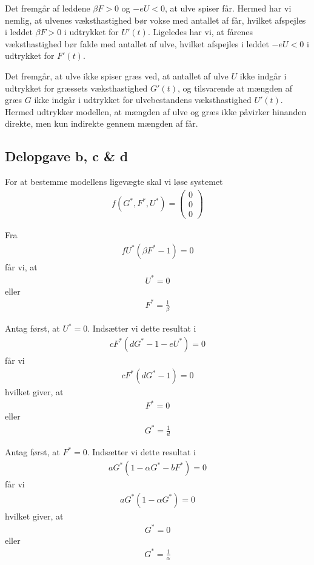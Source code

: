 \documentclass[12pt]{article}
\begin{document}
Det fremgår af leddene $\beta F>0$ og $-eU<0$, at ulve spiser får. Hermed har vi nemlig, at ulvenes væksthastighed bør vokse med antallet af får, hvilket afspejles i leddet $\beta F>0$ i udtrykket for $U'(t)$. Ligeledes har vi, at fårenes væksthastighed bør falde med antallet af ulve, hvilket afspejles i leddet $-eU<0$ i udtrykket for $F'(t)$. 

Det fremgår, at ulve ikke spiser græs ved, at antallet af ulve $U$ ikke indgår i udtrykket for græssets væksthastighed $G'(t)$, og tilsvarende at mængden af græs $G$ ikke indgår i udtrykket for ulvebestandens væksthastighed $U'(t)$. Hermed udtrykker modellen, at mængden af ulve og græs ikke  påvirker hinanden direkte, men kun indirekte gennem mængden af får. 

\subsection{Delopgave b, c \& d}

For at bestemme modellens ligevægte skal vi løse systemet
\begin{align}
f(G^*, F^*, U^*) = \begin{pmatrix}
0 \\ 0 \\ 0
\end{pmatrix}
\end{align}

Fra 
\begin{align}
fU^*(\beta F^* - 1) = 0
\end{align}
får vi, at 
\begin{align}
U^* = 0
\end{align}
eller
\begin{align}
F^* = \frac{1}{\beta}
\end{align}

Antag først, at $U^*=0$. Indsætter vi dette resultat i 
\begin{align}
cF^*(dG^* - 1 - eU^*) = 0
\end{align}
får vi
\begin{align}
cF^*(dG^* - 1) = 0
\end{align}
hvilket giver, at 
\begin{align}
F^* = 0
\end{align}
eller 
\begin{align}
G^* = \frac{1}{d}
\end{align}

Antag først, at $F^*=0$. Indsætter vi dette resultat i 
\begin{align}
aG^*(1 - \alpha G^* - bF^*) = 0
\end{align}
får vi
\begin{align}
aG^*(1 - \alpha G^*) = 0
\end{align}
hvilket giver, at 
\begin{align}
G^* = 0
\end{align}
eller
\begin{align}
G^* = \frac{1}{\alpha}
\end{align}
\end{document}
